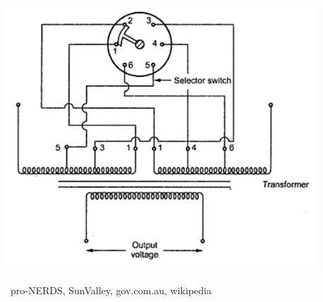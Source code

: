 \documentclass[xcolor=svgnames,aspectratio=32,8pt]{beamer}
\begin{document}
\begin{frame}
\begin{changemargin}{-1cm}{-1cm}
\begin{minipage}[!h]{0.25\paperwidth}
\end{minipage}%
\begin{minipage}[!h]{0.25\paperwidth}
  \centering
  \includegraphics[width=0.2\paperwidth]{OtherImages/OLTC.jpeg}
\end{minipage}
{\footnotesize \textcopyright\ pro-NERDS, SunValley, gov.com.au, wikipedia}
\end{changemargin}    
\end{frame}

\end{document}
